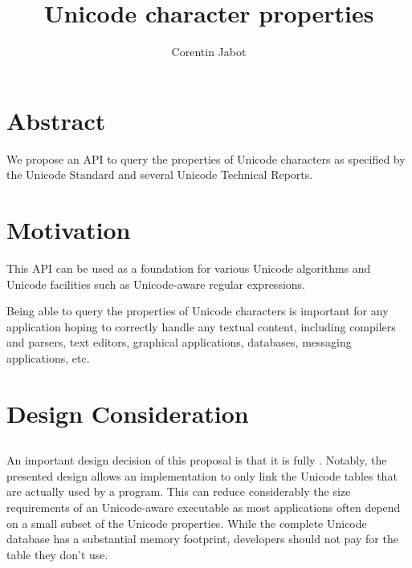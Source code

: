 \documentclass{wg21}
\title{Unicode character properties}
\author{Corentin Jabot}{corentin.jabot@gmail.com}
\begin{document}
\maketitle

\section{Abstract}

We propose an API to query the properties of Unicode characters as specified by the Unicode Standard and
several Unicode Technical Reports.

\section{Motivation}

This API can be used as a foundation for various Unicode algorithms and Unicode facilities such as Unicode-aware
regular expressions.

Being able to query the properties of Unicode characters is important for any application hoping to correctly
handle any textual content, including compilers and parsers, text editors, graphical applications, databases,
messaging applications, etc.


\section{Design Consideration}

\subsection{}

An important design decision of this proposal is that it is fully .
Notably, the presented design allows an implementation to only link the Unicode tables that are actually used by
a program. This can reduce considerably the size requirements of an Unicode-aware executable as most applications
often depend on a small subset of the Unicode properties.
While the complete Unicode database has a substantial memory footprint, developers should
not pay for the table they don't use.
\end{document}
